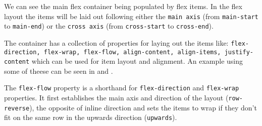 
We can see the main flex container being populated by flex items. In the flex layout the items will be laid out following either the \texttt{main axis} (from \texttt{main-start} to \texttt{main-end}) or the \texttt{cross axis} (from \texttt{cross-start} to \texttt{cross-end}).

The container has a collection of properties for laying out the items like: \texttt{flex-direction, flex-wrap, flex-flow, align-content, align-items, justify-content} which can be used for item layout and alignment. An example using some of theese can be seen in  and .




The \texttt{flex-flow} property is a shorthand for \texttt{flex-direction} and \texttt{flex-wrap} properties. It first establishes the main axis and direction of the layout (\texttt{row-reverse}), the opposite of inline direction and sets the items to wrap if they don't fit on the same row in the upwards direction (\texttt{upwards}).